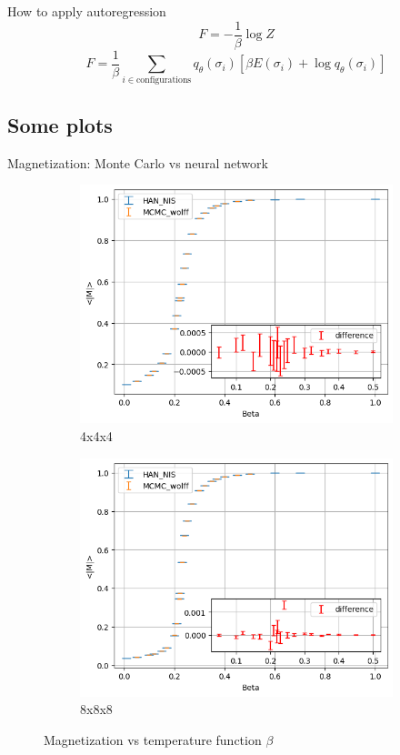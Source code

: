\documentclass{beamer}
\begin{document}
\begin{frame}{How to apply autoregression}
    $$F=-\frac{1}{\beta} \log Z$$
    $$F=\frac{1}{\beta} \sum_{i\in\text{configurations}} q_\theta(\sigma_i)[\beta E(\sigma_i)+\log q_\theta(\sigma_i)]$$
\end{frame}

\subsection{Some plots}
\begin{frame}{Magnetization: Monte Carlo vs neural network}
\begin{figure}
    \centering
    \begin{subfigure}{0.45\textwidth}
    \includegraphics[width=\textwidth]{plots/m4.png}
    \caption{4x4x4}
    \end{subfigure} 
    \hfill
    \begin{subfigure}{0.45\textwidth}
    \includegraphics[width=\textwidth]{plots/m8.png}
    \caption{8x8x8}
    \end{subfigure}
    \caption{Magnetization vs temperature function $\beta$}
\end{figure}
\end{frame}
\end{document}
